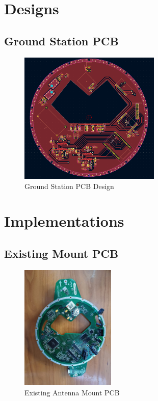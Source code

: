 \chapter{Designs}
\section{Ground Station PCB}\label{sec:appendix_gs_pcb_design}
\begin{figure}[!htb]
  \centering
  \includegraphics[width=0.6\textwidth]{gs_pcb_design}
  \caption{Ground Station PCB Design}
  \label{fig:gs_pcb}
\end{figure}

\chapter{Implementations}
\section{Existing Mount PCB}\label{sec:appendix_gs_pcb_existing}
\begin{figure}[!htb]
  \centering
  \includegraphics[width=0.4\textwidth, angle=90, origin=c]{gs_existing}
  \caption{Existing Antenna Mount PCB}
  \label{fig:gs_existing}
\end{figure}
